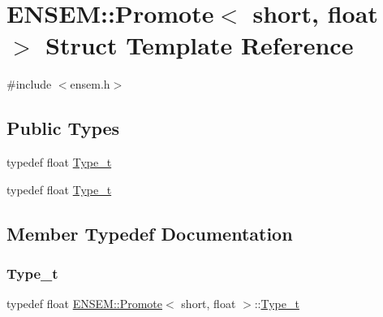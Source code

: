 \hypertarget{structENSEM_1_1Promote_3_01short_00_01float_01_4}{}\section{E\+N\+S\+EM\+:\+:Promote$<$ short, float $>$ Struct Template Reference}
\label{structENSEM_1_1Promote_3_01short_00_01float_01_4}


{\ttfamily \#include $<$ensem.\+h$>$}

\subsection*{Public Types}
\begin{DoxyCompactItemize}
\item 
typedef float \mbox{\hyperlink{structENSEM_1_1Promote_3_01short_00_01float_01_4_a1d4ac20ed44f25a8d1863eda583b89da}{Type\+\_\+t}}
\item 
typedef float \mbox{\hyperlink{structENSEM_1_1Promote_3_01short_00_01float_01_4_a1d4ac20ed44f25a8d1863eda583b89da}{Type\+\_\+t}}
\end{DoxyCompactItemize}


\subsection{Member Typedef Documentation}
\mbox{\label{structENSEM_1_1Promote_3_01short_00_01float_01_4_a1d4ac20ed44f25a8d1863eda583b89da}} 
\subsubsection{\texorpdfstring{Type\_t}{Type\_t}\hspace{0.1cm}{\footnotesize\ttfamily [1/2]}}
{\footnotesize\ttfamily typedef float \mbox{\hyperlink{structENSEM_1_1Promote}{E\+N\+S\+E\+M\+::\+Promote}}$<$ short, float $>$\+::\mbox{\hyperlink{structENSEM_1_1Promote_3_01short_00_01float_01_4_a1d4ac20ed44f25a8d1863eda583b89da}{Type\+\_\+t}}}

\mbox{\label{structENSEM_1_1Promote_3_01short_00_01float_01_4_a1d4ac20ed44f25a8d1863eda583b89da}} 
